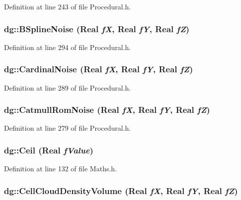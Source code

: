 Definition at line 243 of file Procedural.h.
\subsubsection{ dg::BSpline\-Noise ({\bf Real} {\em f\-X}, {\bf Real} {\em f\-Y}, {\bf Real} {\em f\-Z})\hspace{0.3cm}{\tt  [inline]}}\label{namespacedg_a164}




Definition at line 294 of file Procedural.h.
\subsubsection{ dg::Cardinal\-Noise ({\bf Real} {\em f\-X}, {\bf Real} {\em f\-Y}, {\bf Real} {\em f\-Z})\hspace{0.3cm}{\tt  [inline]}}\label{namespacedg_a163}




Definition at line 289 of file Procedural.h.
\subsubsection{ dg::Catmull\-Rom\-Noise ({\bf Real} {\em f\-X}, {\bf Real} {\em f\-Y}, {\bf Real} {\em f\-Z})\hspace{0.3cm}{\tt  [inline]}}\label{namespacedg_a161}




Definition at line 279 of file Procedural.h.
\subsubsection{ dg::Ceil ({\bf Real} {\em f\-Value})\hspace{0.3cm}{\tt  [inline]}}\label{namespacedg_a91}




Definition at line 132 of file Maths.h.
\subsubsection{ dg::Cell\-Cloud\-Density\-Volume ({\bf Real} {\em f\-X}, {\bf Real} {\em f\-Y}, {\bf Real} {\em f\-Z})\hspace{0.3cm}{\tt  [inline]}}\label{namespacedg_a193}




